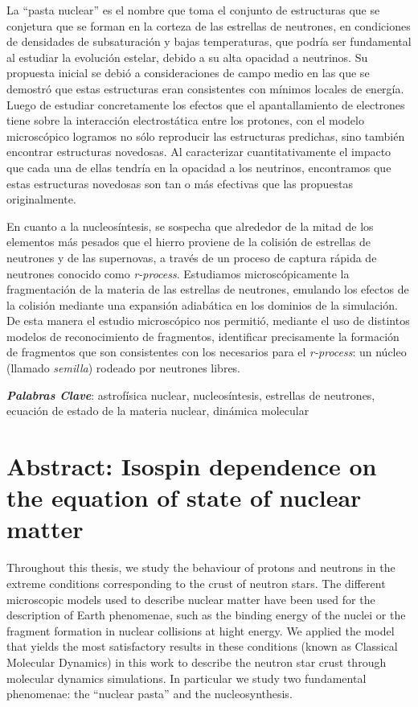 \documentclass[12pt]{book}
\begin{document}
La ``pasta nuclear'' es el nombre que toma el conjunto de estructuras que se conjetura que se forman en la corteza de las estrellas de neutrones, en condiciones de densidades de subsaturación y bajas temperaturas, que podría ser fundamental al estudiar la evolución estelar, debido a su alta opacidad a neutrinos.
Su propuesta inicial se debió a consideraciones de campo medio en las que se demostró que estas estructuras eran consistentes con mínimos locales de energía.
Luego de estudiar concretamente los efectos que el apantallamiento de electrones tiene sobre la interacción electrostática entre los protones, con el modelo microscópico logramos no sólo reproducir las estructuras predichas, sino también encontrar estructuras novedosas.
Al caracterizar cuantitativamente el impacto que cada una de ellas tendría en la opacidad a los neutrinos, encontramos que estas estructuras novedosas son tan o más efectivas que las propuestas originalmente.

En cuanto a la nucleosíntesis, se sospecha que alrededor de la mitad de los elementos más pesados que el hierro proviene de la colisión de estrellas de neutrones y de las supernovas, a través de un proceso de captura rápida de neutrones conocido como \emph{r-process}.
Estudiamos microscópicamente la fragmentación de la materia de las estrellas de neutrones, emulando los efectos de la colisión mediante una expansión adiabática en los dominios de la simulación.
De esta manera el estudio microscópico nos permitió, mediante el uso de distintos modelos de reconocimiento de fragmentos, identificar precisamente la formación de fragmentos que son consistentes con los necesarios para el \emph{r-process}: un núcleo (llamado \emph{semilla}) rodeado por neutrones libres.

\emph{\textbf{Palabras Clave}}: astrofísica nuclear, nucleosíntesis, estrellas de neutrones, ecuación de estado de la materia nuclear, dinámica molecular
\newpage
\section*{Abstract: Isospin dependence on the equation of state of nuclear matter}
Throughout this thesis, we study the behaviour of protons and neutrons in the extreme conditions corresponding to the crust of neutron stars.
The different microscopic models used to describe nuclear matter have been used for the description of Earth phenomenae, such as the binding energy of the nuclei or the fragment formation in nuclear collisions at hight energy.
We applied the model that yields the most satisfactory results in these conditions (known as Classical Molecular Dynamics) in this work to describe the neutron star crust through molecular dynamics simulations.
In particular we study two fundamental phenomenae: the ``nuclear pasta'' and the nucleosynthesis.
\end{document}
